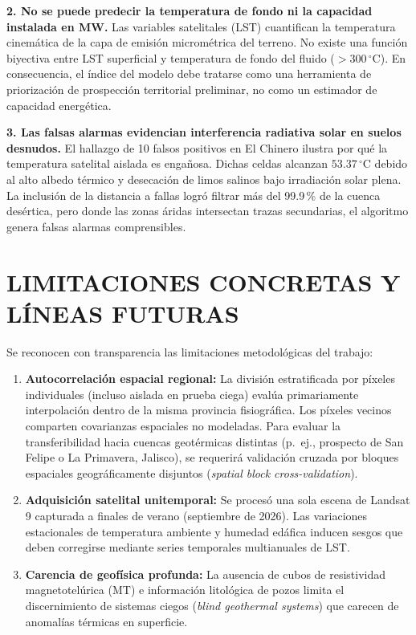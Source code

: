 \documentclass[10pt,twocolumn,letterpaper]{article}
\begin{document}
\textbf{2. No se puede predecir la temperatura de fondo ni la capacidad instalada en MW.}
Las variables satelitales (LST) cuantifican la temperatura cinemática de la capa de emisión micrométrica del terreno. No existe una función biyectiva entre LST superficial y temperatura de fondo del fluido ($>300\,^\circ\text{C}$). En consecuencia, el índice del modelo debe tratarse como una herramienta de priorización de prospección territorial preliminar, no como un estimador de capacidad energética.

\textbf{3. Las falsas alarmas evidencian interferencia radiativa solar en suelos desnudos.}
El hallazgo de 10 falsos positivos en El Chinero ilustra por qué la temperatura satelital aislada es engañosa. Dichas celdas alcanzan $53.37\,^\circ\text{C}$ debido al alto albedo térmico y desecación de limos salinos bajo irradiación solar plena. La inclusión de la distancia a fallas logró filtrar más del 99.9\,\% de la cuenca desértica, pero donde las zonas áridas intersectan trazas secundarias, el algoritmo genera falsas alarmas comprensibles.

\section{LIMITACIONES CONCRETAS Y LÍNEAS FUTURAS}

Se reconocen con transparencia las limitaciones metodológicas del trabajo:

\begin{enumerate}[leftmargin=1.2em]
  \item \textbf{Autocorrelación espacial regional:} La división estratificada por píxeles individuales (incluso aislada en prueba ciega) evalúa primariamente interpolación dentro de la misma provincia fisiográfica. Los píxeles vecinos comparten covarianzas espaciales no modeladas. Para evaluar la transferibilidad hacia cuencas geotérmicas distintas (p.~ej., prospecto de San Felipe o La Primavera, Jalisco), se requerirá validación cruzada por bloques espaciales geográficamente disjuntos (\emph{spatial block cross-validation}).
  \item \textbf{Adquisición satelital unitemporal:} Se procesó una sola escena de Landsat 9 capturada a finales de verano (septiembre de 2026). Las variaciones estacionales de temperatura ambiente y humedad edáfica inducen sesgos que deben corregirse mediante series temporales multianuales de LST.
  \item \textbf{Carencia de geofísica profunda:} La ausencia de cubos de resistividad magnetotelúrica (MT) e información litológica de pozos limita el discernimiento de sistemas ciegos (\emph{blind geothermal systems}) que carecen de anomalías térmicas en superficie.
\end{enumerate}
\end{document}
